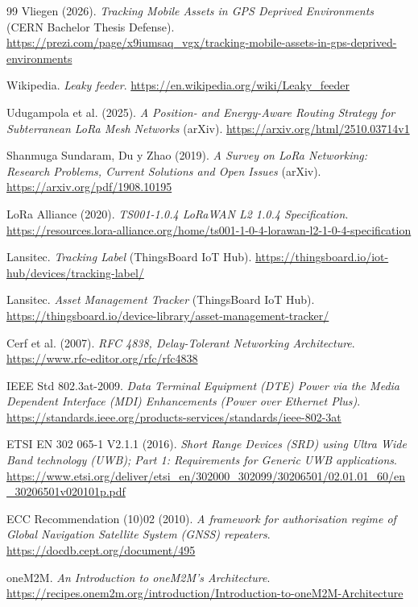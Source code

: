 \documentclass[11pt,a4paper]{article}
\begin{document}
\begin{thebibliography}{99}
     Vliegen (2026). \emph{Tracking Mobile Assets in GPS Deprived Environments} (CERN Bachelor Thesis Defense). \url{https://prezi.com/page/x9iumsaq_vgx/tracking-mobile-assets-in-gps-deprived-environments}

     Wikipedia. \emph{Leaky feeder}. \url{https://en.wikipedia.org/wiki/Leaky_feeder}

     Udugampola et al. (2025). \emph{A Position- and Energy-Aware Routing Strategy for Subterranean LoRa Mesh Networks} (arXiv). \url{https://arxiv.org/html/2510.03714v1}

     Shanmuga Sundaram, Du y Zhao (2019). \emph{A Survey on LoRa Networking: Research Problems, Current Solutions and Open Issues} (arXiv). \url{https://arxiv.org/pdf/1908.10195}

     LoRa Alliance (2020). \emph{TS001-1.0.4 LoRaWAN L2 1.0.4 Specification}. \url{https://resources.lora-alliance.org/home/ts001-1-0-4-lorawan-l2-1-0-4-specification}

     Lansitec. \emph{Tracking Label} (ThingsBoard IoT Hub). \url{https://thingsboard.io/iot-hub/devices/tracking-label/}

     Lansitec. \emph{Asset Management Tracker} (ThingsBoard IoT Hub). \url{https://thingsboard.io/device-library/asset-management-tracker/}

     Cerf et al. (2007). \emph{RFC 4838, Delay-Tolerant Networking Architecture}. \url{https://www.rfc-editor.org/rfc/rfc4838}

     IEEE Std 802.3at-2009. \emph{Data Terminal Equipment (DTE) Power via the Media Dependent Interface (MDI) Enhancements (Power over Ethernet Plus)}. \url{https://standards.ieee.org/products-services/standards/ieee-802-3at}

     ETSI EN 302 065-1 V2.1.1 (2016). \emph{Short Range Devices (SRD) using Ultra Wide Band technology (UWB); Part 1: Requirements for Generic UWB applications}. \url{https://www.etsi.org/deliver/etsi_en/302000_302099/30206501/02.01.01_60/en_30206501v020101p.pdf}

     ECC Recommendation (10)02 (2010). \emph{A framework for authorisation regime of Global Navigation Satellite System (GNSS) repeaters}. \url{https://docdb.cept.org/document/495}

     oneM2M. \emph{An Introduction to oneM2M's Architecture}. \url{https://recipes.onem2m.org/introduction/Introduction-to-oneM2M-Architecture}


\end{thebibliography}
\end{document}
